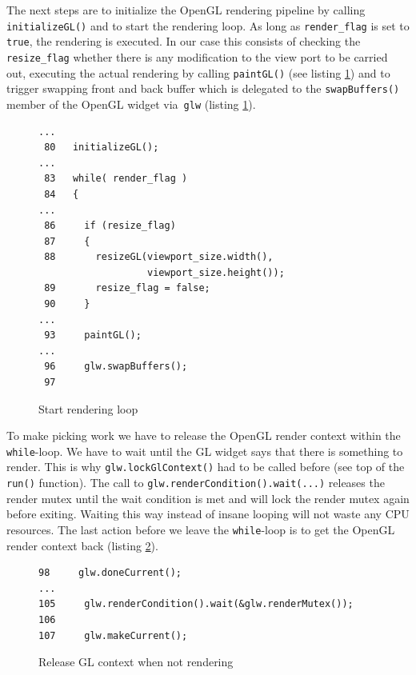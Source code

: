 \documentclass[jou,noapacite]{apa}
\begin{document}
The next steps are to initialize the OpenGL rendering pipeline by
calling \lstinline|initializeGL()| and to start the rendering loop.
%
As long as \lstinline|render_flag| is set to \lstinline[keywordstyle=\color{black}]|true|, the rendering is executed.
%
In our case this consists of checking the \lstinline|resize_flag| whether there
is any modification to the view port to be carried out, executing the actual
rendering by calling \lstinline|paintGL()| (see listing \ref{lst:rloop}) and to trigger swapping
front and back buffer which is delegated to the \lstinline|swapBuffers()| member
of the OpenGL widget via~\lstinline|glw| (listing \ref{lst:rloop}).
%
\begin{figure}[h]
\begin{lstlisting}[basicstyle=\scriptsize]
...
 80   initializeGL();
...
 83   while( render_flag )
 84   {
...
 86     if (resize_flag)
 87     {
 88       resizeGL(viewport_size.width(),
                   viewport_size.height());
 89       resize_flag = false;
 90     }
...
 93     paintGL();
...
 96     glw.swapBuffers();
 97
\end{lstlisting}
\caption{Start rendering loop}
\label{lst:rloop}
\end{figure}

To make picking work we have to release the OpenGL render context within
the \lstinline[keywordstyle=\color{black}]|while|-loop.
%
We have to wait until the GL widget says that there is something to render.
%
This is why \lstinline|glw.lockGlContext()| had to be called before (see top of
the \lstinline|run()| function).
%
The call to \lstinline|glw.renderCondition().wait(...)| releases the render
mutex until the wait condition is met and will lock the render mutex again
before exiting.
%
Waiting this way instead of insane looping will not waste any CPU resources.
%
The last action before we leave the \lstinline[keywordstyle=\color{black}]|while|-loop is to get the OpenGL
render context back (listing \ref{lst:waitcond}).
%
\begin{figure}[h]
\begin{lstlisting}[basicstyle=\scriptsize]
 98     glw.doneCurrent();
...
105     glw.renderCondition().wait(&glw.renderMutex());
106
107     glw.makeCurrent();
\end{lstlisting}
\caption{Release GL context when not rendering}
\label{lst:waitcond}
\end{figure}
\end{document}
